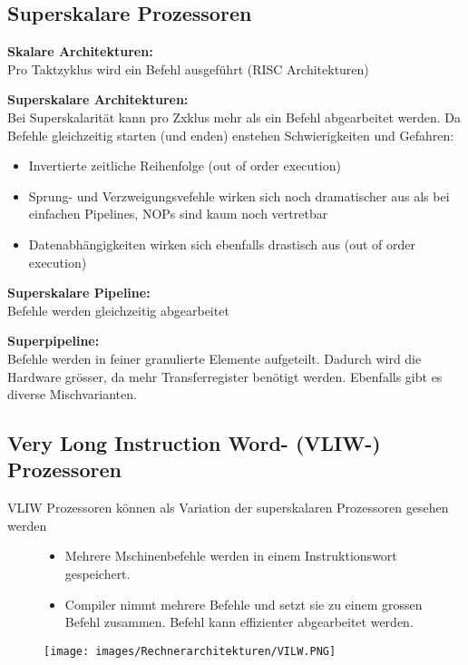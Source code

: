 \clearpage
\subsection{Superskalare Prozessoren}
\textbf{Skalare Architekturen:}\\
Pro Taktzyklus wird ein Befehl ausgeführt (RISC Architekturen)

\textbf{Superskalare Architekturen:}\\
Bei Superskalarität kann pro Zxklus mehr als ein Befehl abgearbeitet werden.
Da Befehle gleichzeitig starten (und enden) enstehen Schwierigkeiten und Gefahren:
\begin{itemize}[noitemsep,topsep=0pt]
	\item Invertierte zeitliche Reihenfolge (out of order execution)
	\item Sprung- und Verzweigungsvefehle wirken sich noch dramatischer aus als bei einfachen Pipelines, NOPs sind kaum noch vertretbar
	\item Datenabhängigkeiten wirken sich ebenfalls drastisch aus (out of order execution)
			
\end{itemize}

\textbf{Superskalare Pipeline:}\\
Befehle werden gleichzeitig abgearbeitet

\textbf{Superpipeline:}\\
Befehle werden in feiner granulierte Elemente aufgeteilt. Dadurch wird die Hardware grösser, da mehr Transferregister benötigt werden.\newline
Ebenfalls gibt es diverse Mischvarianten.
\vspace{-0.5cm}
\subsection{Very Long Instruction Word- (VLIW-) Prozessoren}
VLIW Prozessoren können als Variation der superskalaren Prozessoren gesehen werden

\begin{figure}[htbp]
	
	\begin{minipage}{0.55\textwidth}
		\begin{itemize}[noitemsep,topsep=0pt]
			\item Mehrere Mschinenbefehle werden in einem Instruktionswort gespeichert.
			\item Compiler nimmt mehrere Befehle und setzt sie zu einem grossen Befehl zusammen. Befehl kann effizienter abgearbeitet werden.
			
		\end{itemize}
		
	\end{minipage}
	\hfill		
	\begin{minipage}{0.4\textwidth} 
		\texttt{[image: images/Rechnerarchitekturen/VILW.PNG]}
	\end{minipage}
	
\end{figure}
\vspace{-1cm}

